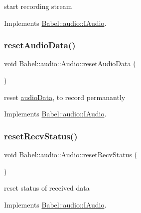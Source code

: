 start recording stream 

Implements \hyperlink{classBabel_1_1audio_1_1IAudio_a35c021d9d38ffeeec1aa8c6890e30151}{Babel\+::audio\+::\+I\+Audio}.

\mbox{\label{classBabel_1_1audio_1_1Audio_a6b50d630ceea9a41088c3e5f8f4694f6}} 
\subsubsection{\texorpdfstring{reset\+Audio\+Data()}{resetAudioData()}}
{\footnotesize\ttfamily void Babel\+::audio\+::\+Audio\+::reset\+Audio\+Data (\begin{DoxyParamCaption}{ }\end{DoxyParamCaption})\hspace{0.3cm}{\ttfamily [virtual]}}

reset \hyperlink{structaudioData}{audio\+Data}, to record permanantly 

Implements \hyperlink{classBabel_1_1audio_1_1IAudio_a879bde00b067128659a6108a883a10f7}{Babel\+::audio\+::\+I\+Audio}.

\mbox{\label{classBabel_1_1audio_1_1Audio_a4d66042877979c713c9e20915b48d2d4}} 
\subsubsection{\texorpdfstring{reset\+Recv\+Status()}{resetRecvStatus()}}
{\footnotesize\ttfamily void Babel\+::audio\+::\+Audio\+::reset\+Recv\+Status (\begin{DoxyParamCaption}{ }\end{DoxyParamCaption})\hspace{0.3cm}{\ttfamily [virtual]}}

reset status of received data 

Implements \hyperlink{classBabel_1_1audio_1_1IAudio_ab3bd4c604b1a0e1611f280b1d27fe16b}{Babel\+::audio\+::\+I\+Audio}.

\mbox{\label{classBabel_1_1audio_1_1Audio_ab14103faf465d65eab05f70a53d6ce67}} 
